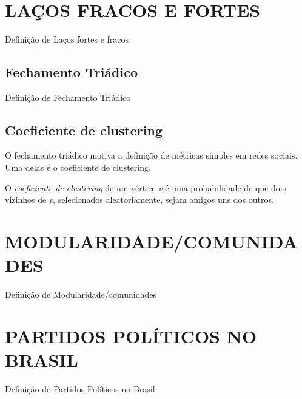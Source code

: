 ~\cite{easley2010networks}


\section{\texorpdfstring{\MakeUppercase{Laços Fracos e Fortes}}{}}
\label{conceitos__lacos-fortes-fracos}

Definição de Laços fortes e fracos

\subsection{Fechamento Triádico}
\label{conceitos__lacos-fortes-fracos--fechamento-triadico}

Definição de Fechamento Triádico

\subsection{Coeficiente de clustering}
\label{conceitos__lacos-fortes-fracos--coeficiente-clustering}

O fechamento triádico motiva a definição de métricas simples em redes sociais. Uma delas é o coeficiente de clustering.

O \emph{coeficiente de clustering} de um vértice \emph{v} é uma probabilidade de que dois vizinhos de \emph{v}, selecionados aleatoriamente, sejam amigos uns dos outros.

\section{\texorpdfstring{\MakeUppercase{Modularidade/comunidades}}{}}
\label{conceitos__modularidade}

Definição de Modularidade/comunidades

\section{\texorpdfstring{\MakeUppercase{Partidos Políticos no Brasil}}{}}
\label{conceitos__partidos-brasil}

Definição de Partidos Políticos no Brasil


